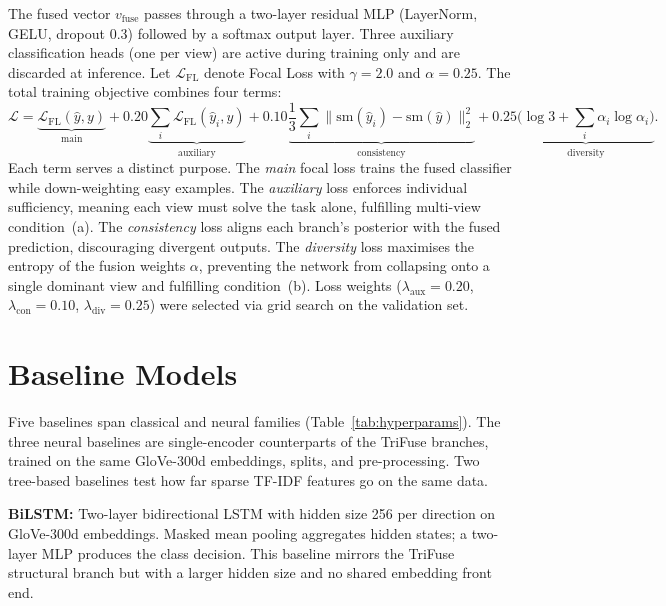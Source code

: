 \documentclass[10pt,twocolumn,a4paper]{article}
\begin{document}
The fused vector $v_{\mathrm{fuse}}$ passes through a two-layer residual MLP (LayerNorm, GELU, dropout 0.3) followed by a softmax output layer. Three auxiliary classification heads (one per view) are active during training only and are discarded at inference. Let $\mathcal{L}_{\mathrm{FL}}$ denote Focal Loss \citep{ref23} with $\gamma{=}2.0$ and $\alpha{=}0.25$. The total training objective combines four terms:
\begin{equation}
\mathcal{L} = \underbrace{\mathcal{L}_{\mathrm{FL}}(\hat{y}, y)}_{\text{main}} + 0.20\underbrace{\sum_i \mathcal{L}_{\mathrm{FL}}(\hat{y}_i, y)}_{\text{auxiliary}} + 0.10\underbrace{\frac{1}{3}\sum_i \|\mathrm{sm}(\hat{y}_i) - \mathrm{sm}(\hat{y})\|_2^2}_{\text{consistency}} + 0.25\underbrace{\bigl(\log 3 + \sum_i \alpha_i \log \alpha_i\bigr)}_{\text{diversity}}.
\end{equation}
Each term serves a distinct purpose. The \emph{main} focal loss trains the fused classifier while down-weighting easy examples. The \emph{auxiliary} loss enforces individual sufficiency, meaning each view must solve the task alone, fulfilling multi-view condition~(a). The \emph{consistency} loss aligns each branch's posterior with the fused prediction, discouraging divergent outputs. The \emph{diversity} loss maximises the entropy of the fusion weights $\alpha$, preventing the network from collapsing onto a single dominant view and fulfilling condition~(b). Loss weights ($\lambda_{\mathrm{aux}}{=}0.20$, $\lambda_{\mathrm{con}}{=}0.10$, $\lambda_{\mathrm{div}}{=}0.25$) were selected via grid search on the validation set.

\section{Baseline Models}\label{sec:baselines}

Five baselines span classical and neural families (Table~\ref{tab:hyperparams}). The three neural baselines are single-encoder counterparts of the TriFuse branches, trained on the same GloVe-300d embeddings, splits, and pre-processing. Two tree-based baselines test how far sparse TF-IDF features go on the same data.

\textbf{BiLSTM:} Two-layer bidirectional LSTM with hidden size 256 per direction on GloVe-300d embeddings. Masked mean pooling aggregates hidden states; a two-layer MLP produces the class decision. This baseline mirrors the TriFuse structural branch but with a larger hidden size and no shared embedding front end.
\end{document}
